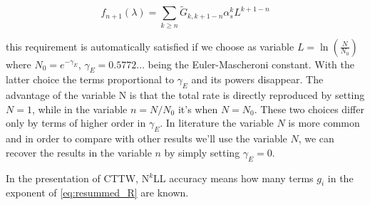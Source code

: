 \documentclass[../main.tex]{subfiles}
\begin{document}
\begin{equation}
    f_{n+1}(\lambda) = \sum_{k \ge n} \tilde{G}_{k,k+1-n} \alpha_s^k L^{k+1-n}
\end{equation}

this requirement is automatically satisfied if we choose as variable $L = \ln(\frac{N}{N_0})$ where $N_0 = e^{-\gamma_E}$, $\gamma_E = 0.5772 \dots $ being the Euler-Mascheroni constant.
With the latter choice the terms proportional to $\gamma_E$ and its powers disappear. The advantage of the variable N is that the total rate is directly reproduced by setting $N=1$, while
in the variable $n=N/N_0$ it's when $N=N_0$. These two choices differ only by terms of higher order in $\gamma_E$.
In literature the variable $N$ is more common and in order to compare with other results we'll use the variable $N$, we can recover the results in the variable $n$ by simply setting $\gamma_E = 0$.

In the presentation of CTTW, N$^k$LL accuracy means how many terms $g_i$ in the exponent of \cref{eq:resummed_R} are known.
\end{document}
